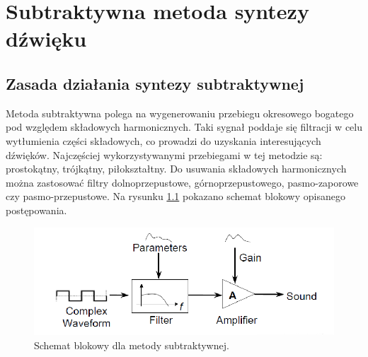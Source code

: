\chapter{Subtraktywna metoda syntezy dźwięku}\label{chapter_subtractive}
\section{Zasada działania syntezy subtraktywnej}
Metoda subtraktywna polega na wygenerowaniu przebiegu okresowego bogatego pod względem składowych harmonicznych. Taki sygnał poddaje się filtracji w celu wytłumienia części składowych, co prowadzi do uzyskania interesujących dźwięków. Najczęściej wykorzystywanymi przebiegami w tej metodzie są: prostokątny, trójkątny, piłokształtny. Do usuwania składowych harmonicznych można zastosować filtry dolnoprzepustowe, górnoprzepustowego, pasmo-zaporowe czy pasmo-przepustowe. Na rysunku \ref{rys:sub_diagram} pokazano schemat blokowy opisanego postępowania.

\begin{figure}[H]
	\centering
	\includegraphics[width=12cm]{grafiki/sub_diagram}
	\captionsetup{justification=centering}
	\caption{Schemat blokowy dla metody subtraktywnej.}
	\label{rys:sub_diagram}
\end{figure}

